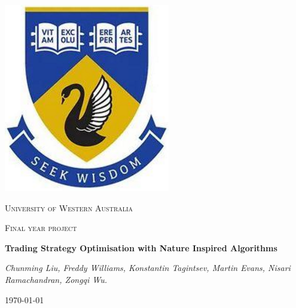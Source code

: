 \begin{titlepage}


\thispagestyle{empty}
\setlength\headheight{0pt} 
\begin{center}

\begin{center}
\includegraphics[width=0.25\linewidth]{img/uwa.PNG}            
\end{center}	

        \vspace{0.25cm}
        {\scshape\LARGE University of Western Australia \par}
        \vspace{0.25cm}
        {\scshape\Large Final year project\par}
        \vspace{0.5cm}

        {\Large\bfseries Trading Strategy Optimisation with Nature Inspired Algorithms \par}
        
        \vspace{0.5cm}
        {\small\itshape Chunming Liu, Freddy Williams, Konstantin Tagintsev, Martin Evans, 
        Nisari Ramachandran, Zongqi Wu.
         \par}
        \vspace{0.25cm}

\vspace{1cm}
\large
\today

\end{center}

\clearpage
\restoregeometry
\end{titlepage}
